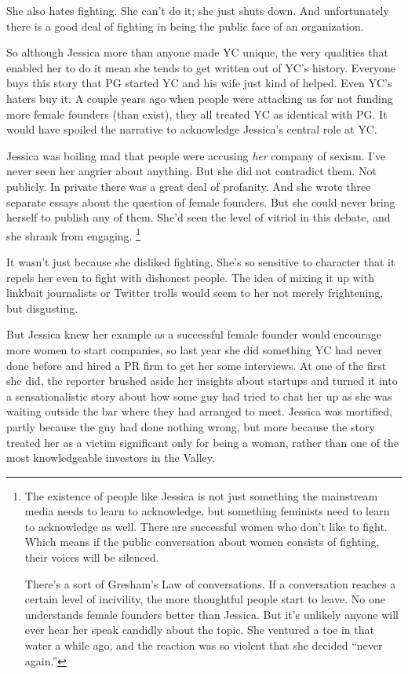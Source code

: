 She also hates fighting. She can't do it; she just shuts down. And
unfortunately there is a good deal of fighting in being the public face
of an organization.

So although Jessica more than anyone made YC unique, the very qualities
that enabled her to do it mean she tends to get written out of YC's
history. Everyone buys this story that PG started YC and his wife just
kind of helped. Even YC's haters buy it. A couple years ago when people
were attacking us for not funding more female founders (than exist),
they all treated YC as identical with PG. It would have spoiled the
narrative to acknowledge Jessica's central role at YC.

Jessica was boiling mad that people were accusing \emph{her} company of
sexism. I've never seen her angrier about anything. But she did not
contradict them. Not publicly. In private there was a great deal of
profanity. And she wrote three separate essays about the question of
female founders. But she could never bring herself to publish any of
them. She'd seen the level of vitriol in this debate, and she shrank
from engaging. \footnote{The existence of people like Jessica is not just something the
mainstream media needs to learn to acknowledge, but something feminists
need to learn to acknowledge as well. There are successful women who
don't like to fight. Which means if the public conversation about women
consists of fighting, their voices will be silenced.

There's a sort of Gresham's Law of conversations. If a conversation
reaches a certain level of incivility, the more thoughtful people start
to leave. No one understands female founders better than Jessica. But
it's unlikely anyone will ever hear her speak candidly about the topic.
She ventured a toe in that water a while ago, and the reaction was so
violent that she decided ``never again.''}

It wasn't just because she disliked fighting. She's so sensitive to
character that it repels her even to fight with dishonest people. The
idea of mixing it up with linkbait journalists or Twitter trolls would
seem to her not merely frightening, but disgusting.

But Jessica knew her example as a successful female founder would
encourage more women to start companies, so last year she did something
YC had never done before and hired a PR firm to get her some interviews.
At one of the first she did, the reporter brushed aside her insights
about startups and turned it into a sensationalistic story about how
some guy had tried to chat her up as she was waiting outside the bar
where they had arranged to meet. Jessica was mortified, partly because
the guy had done nothing wrong, but more because the story treated her
as a victim significant only for being a woman, rather than one of the
most knowledgeable investors in the Valley.


